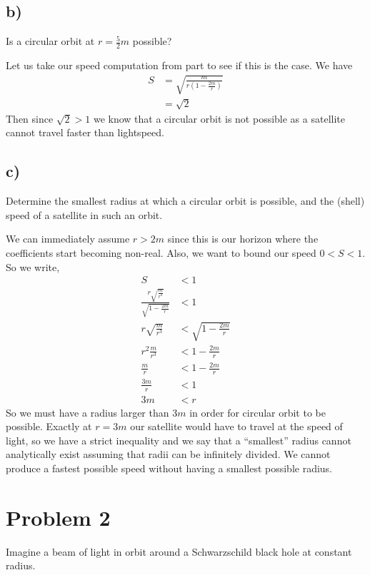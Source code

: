 \documentclass{article}
\theoremstyle{definition}
\begin{document}
    \subsection*{b)}
        \begin{mdframed}
            Is a circular orbit at $r = \frac{5}{2}m$ possible?
        \end{mdframed}
        Let us take our speed computation from part  to see if this is the case.
        We have 
        \begin{align*}
            S &= \sqrt{\frac{m}{r(1- \frac{2m}{r})}}\\
            &=\sqrt{2}
        \end{align*}
        Then since $\sqrt{2} > 1$ we know that a circular orbit is not possible as a satellite cannot travel faster than lightspeed.
    \subsection*{c)}
        \begin{mdframed}
            Determine the smallest radius at which a circular orbit is possible, and the (shell) speed of a satellite in
            such an orbit.
        \end{mdframed}
        We can immediately assume $r > 2m$ since this is our horizon where the coefficients start becoming non-real.
        Also, we want to bound our speed $0 < S < 1$. So we write,
        \begin{align*}
            S &< 1 \\
            \frac{r\sqrt{\frac{m}{r^3}}}{\sqrt{1-\frac{2m}{r}}} & < 1\\
            r \sqrt{\frac{m}{r^3}} &< \sqrt{1-\frac{2m}{r}} \\
            r^2 \frac{m}{r^3} & < 1 - \frac{2m}{r} \\
            \frac{m}{r}& < 1 - \frac{2m}{r} \\
            \frac{3m}{r} & < 1 \\
            3m &< r
        \end{align*}
        So we must have a radius larger than $3m$ in order for circular orbit to be possible.
        Exactly at $r = 3m$ our satellite would have to travel at the speed of light, so we have a strict inequality and 
        we say that a ``smallest'' radius cannot analytically exist assuming that radii can be infinitely divided.
        We cannot produce a fastest possible speed without having a smallest possible radius.
\section*{Problem 2}
Imagine a beam of light in orbit around a Schwarzschild black hole at constant radius.
\end{document}
